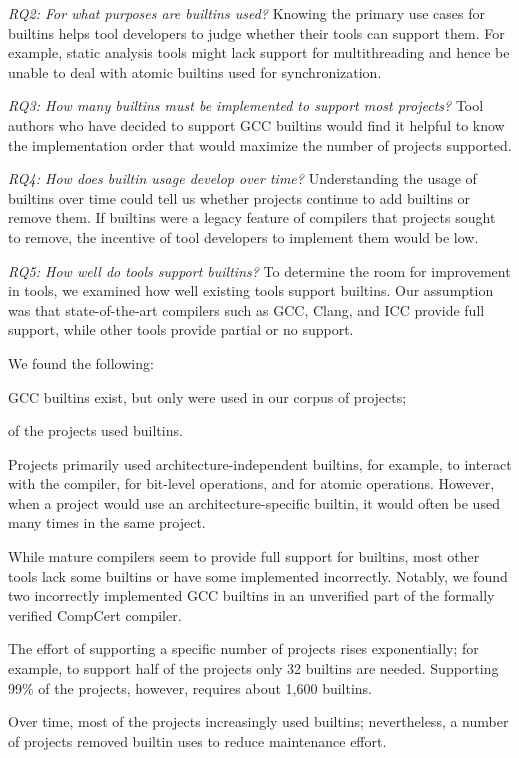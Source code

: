 \documentclass[sigconf,screen]{acmart}
\newcommand\ninetyninepercprojectsapproxnumberbuiltins{1,600} %
\newcommand\halfprojectnumberbuiltins{32} %
\begin{document}
\emph{RQ2: For what purposes are builtins used?}
Knowing the primary use cases for builtins helps tool developers to judge whether their tools can support them.
For example, static analysis tools might lack support for multithreading and hence be unable to deal with atomic builtins used for synchronization.

\emph{RQ3: How many builtins must be implemented to support most projects?}
Tool authors who have decided to support GCC builtins would find it helpful to know the implementation order that would maximize the number of projects supported.

\emph{RQ4: How does builtin usage develop over time?}
Understanding the usage of builtins over time could tell us whether projects continue to add builtins or remove them.
If builtins were a legacy feature of compilers that projects sought to remove, the incentive of tool developers to implement them would be low.

\emph{RQ5: How well do tools support builtins?}
To determine the room for improvement in tools, we examined how well existing tools support builtins.
Our assumption was that state-of-the-art compilers such as GCC, Clang, and ICC provide full support, while other tools provide partial or no support.

We found the following:
\begin{compactitem}
\item \nrTotalTerms{} GCC builtins exist, but only \nrUsedBuiltins{} were used in our corpus of projects;
\item \percentageProjectsWithBuiltins{} of the projects used builtins. 
\item Projects primarily used architecture-independent builtins, for example, to interact with the compiler, for bit-level operations, and for atomic operations. However, when a project would use an ar\-chi\-tec\-ture-specific builtin, it would often be used many times in the same project.
\item While mature compilers seem to provide full support for builtins, most other tools lack some builtins or have some implemented incorrectly. Notably, we found two incorrectly implemented GCC builtins in an unverified part of the formally verified CompCert compiler.
\item The effort of supporting a specific number of projects rises exponentially; for example, to support half of the projects only \halfprojectnumberbuiltins{} builtins are needed.
  Supporting 99\% of the projects, however, requires about \ninetyninepercprojectsapproxnumberbuiltins{} builtins.
\item Over time, most of the projects increasingly used builtins; nevertheless, a number of projects removed builtin uses to reduce maintenance effort.
\end{compactitem}
\end{document}
